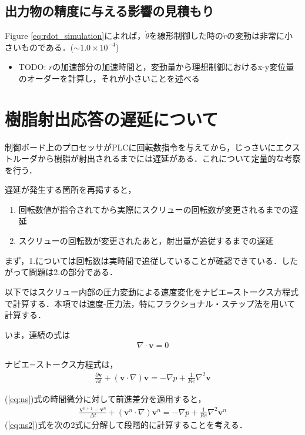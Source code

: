 \documentclass[twocolumn,oneside,a4paper]{article}
\begin{document}
\subsection{出力物の精度に与える影響の見積もり}
Figure \ref{eq:rdot_simulation}によれば，$\dot{\theta}$を線形制御した時の$\dot r$の変動は非常に小さいものである．($\sim 1.0 \times 10^{-4}$)

\begin{itemize}
	\item TODO: $\dot r$の加速部分の加速時間と，変動量から理想制御におけるx-y変位量のオーダーを計算し，それが小さいことを述べる
\end{itemize}




\section{樹脂射出応答の遅延について}
制御ボード上のプロセッサがPLCに回転数指令を与えてから，じっさいにエクストルーダから樹脂が射出されるまでには遅延がある．これについて定量的な考察を行う．

遅延が発生する箇所を再掲すると，
\begin{enumerate}
    \item 回転数値が指令されてから実際にスクリューの回転数が変更されるまでの遅延
    \item スクリューの回転数が変更されたあと，射出量が追従するまでの遅延
\end{enumerate}

まず，1.については回転数は実時間で追従していることが確認できている．したがって問題は2.の部分である．

以下ではスクリュー内部の圧力変動による速度変化をナビエ=ストークス方程式で計算する．本項では速度-圧力法，特にフラクショナル・ステップ法\cite{nagare,ranryu}を用いて計算する．

いま，連続の式は
\begin{eqnarray}\label{eq:continuous}
	\nabla \cdot \bm{v} = 0
\end{eqnarray}

ナビエ=ストークス方程式は，
\begin{eqnarray}\label{eq:ns}
	\frac{\partial \bm{v}}{\partial t} + (\bm{v}\cdot \nabla)\bm{v} = -\nabla p + \frac{1}{Re} \nabla^2 \bm{v}
\end{eqnarray}

(\ref{eq:ns})式の時間微分に対して前進差分を適用すると，
\begin{eqnarray}\label{eq:ns2}
	\frac{\bm{v}^{n+1}-\bm{v}^n}{\Delta t} + (\bm{v}^n \cdot \nabla )\bm{v}^n = - \nabla p + \frac{1}{Re} \nabla^2 \bm{v}^n
\end{eqnarray}
(\ref{eq:ns2})式を次の2式に分解して段階的に計算することを考える．
\end{document}

